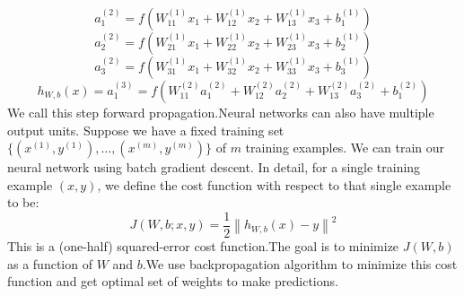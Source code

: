 \documentclass[10pt,twocolumn,letterpaper]{article}
\begin{document}
$$a_1^{(2)} = f(W_{11}^{(1)}x_1 + W_{12}^{(1)} x_2 + W_{13}^{(1)} x_3 + b_1^{(1)})$$
$$a_2^{(2)} = f(W_{21}^{(1)}x_1 + W_{22}^{(1)} x_2 + W_{23}^{(1)} x_3 + b_2^{(1)})$$
$$ a_3^{(2)} = f(W_{31}^{(1)}x_1 + W_{32}^{(1)} x_2 + W_{33}^{(1)} x_3 + b_3^{(1)})$$
$$h_{W,b}(x) = a_1^{(3)} =  f(W_{11}^{(2)}a_1^{(2)} + W_{12}^{(2)} a_2^{(2)} + W_{13}^{(2)} a_3^{(2)} + b_1^{(2)})$$
We call this step forward propagation.Neural networks can also have multiple output units.
Suppose we have a fixed training set $\{ (x^{(1)}, y^{(1)}), \ldots, (x^{(m)}, y^{(m)}) \}$ of $m$ training examples. We can train our neural network using batch gradient descent. In detail, for a single training example $(x,y)$, we define the cost function with respect to that single example to be:
$$ J(W,b; x,y) = \frac{1}{2} \left\| h_{W,b}(x) - y \right\|^2$$
This is a (one-half) squared-error cost function.The goal is to minimize $J(W,b)$ as a function of $W$ and $b$.We use backpropagation algorithm to minimize this cost function and get optimal set of weights to make predictions.
\end{document}
